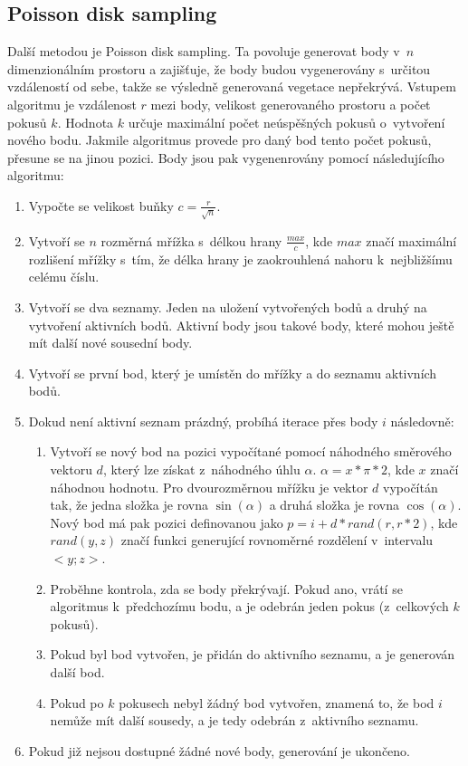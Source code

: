 \subsection*{Poisson disk sampling} \label{poisson_sampling}
Další metodou je Poisson disk sampling. Ta povoluje generovat body v~$n$ dimenzionálním prostoru a zajišťuje, že body budou vygenerovány s~určitou vzdáleností od sebe, takže se výsledně generovaná vegetace nepřekrývá. Vstupem algoritmu je vzdálenost $r$ mezi body, velikost generovaného prostoru a počet pokusů $k$. Hodnota $k$ určuje maximální počet neúspěšných pokusů o~vytvoření nového bodu. Jakmile algoritmus provede pro daný bod tento počet pokusů, přesune se na jinou pozici. Body jsou pak vygenenrovány pomocí následujícího algoritmu:
\begin{enumerate}
  \item Vypočte se velikost buňky $c = \frac{r}{\sqrt{n}}$.
  \item Vytvoří se $n$ rozměrná mřížka s~délkou hrany $\frac{max}{c}$, kde $max$ značí maximální rozlišení mřížky s~tím, že délka hrany je zaokrouhlená nahoru k~nejbližšímu celému číslu.
  \item Vytvoří se dva seznamy. Jeden na uložení vytvořených bodů a druhý na vytvoření aktivních bodů. Aktivní body jsou takové body, které mohou ještě mít další nové sousední body.
  \item Vytvoří se první bod, který je umístěn do mřížky a do seznamu aktivních bodů.
  \item Dokud není aktivní seznam prázdný, probíhá iterace přes body $i$ následovně:
  \begin{enumerate}
    \item Vytvoří se nový bod na pozici vypočítané pomocí náhodného směrového vektoru $d$, který lze získat z~náhodného úhlu $\alpha$. $\alpha = x * \pi * 2$, kde $x$ značí náhodnou hodnotu. Pro dvourozměrnou mřížku je vektor $d$ vypočítán tak, že jedna složka je rovna $\sin(\alpha)$ a druhá složka je rovna $\cos(\alpha)$. Nový bod má pak pozici definovanou jako $p = i + d * rand(r, r*2)$, kde $rand(y,z)$ značí funkci generující rovnoměrné rozdělení v~intervalu $<y;z>$.
    \item Proběhne kontrola, zda se body překrývají. Pokud ano, vrátí se algoritmus k~předchozímu bodu, a je odebrán jeden pokus (z~celkových $k$ pokusů).
    \item Pokud byl bod vytvořen, je přidán do aktivního seznamu, a je generován další bod.
    \item Pokud po $k$ pokusech nebyl žádný bod vytvořen, znamená to, že bod $i$ nemůže mít další sousedy, a je tedy odebrán z~aktivního seznamu.
  \end{enumerate}
  \item Pokud již nejsou dostupné žádné nové body, generování je ukončeno.
\end{enumerate}


